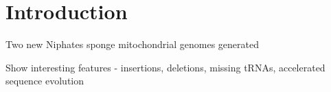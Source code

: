 \documentclass[../main.tex]{subfiles}
\begin{document}
\section{Introduction}

Two new Niphates sponge mitochondrial genomes generated

Show interesting features - insertions, deletions, missing tRNAs, accelerated sequence evolution
\end{document}
